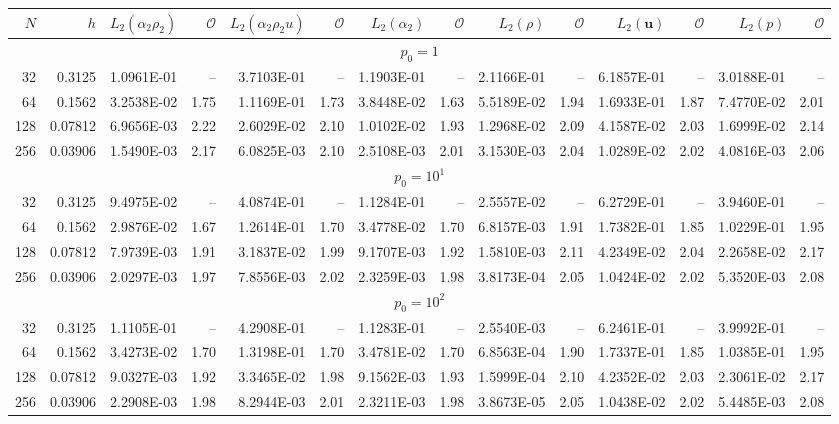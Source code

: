\begin{tabular}{rrrrrrrrrrrrrr}
\hline
$N$ & $h$ & $L_2(\alpha_2\rho_2)$ & $\mathcal{O}$ & $L_2(\alpha_2\rho_2u)$ & $\mathcal{O}$ & $L_2(\alpha_2)$ & $\mathcal{O}$ & $L_2(\rho)$ & $\mathcal{O}$ & $L_2(\mathbf{u})$ & $\mathcal{O}$ & $L_2(p)$ & $\mathcal{O}$ \\
\hline
\multicolumn{14}{c}{$p_0=1$} \\
32 & 0.3125 & 1.0961E-01 & -- & 3.7103E-01 & -- & 1.1903E-01 & -- & 2.1166E-01 & -- & 6.1857E-01 & -- & 3.0188E-01 & -- \\
64 & 0.1562 & 3.2538E-02 & 1.75 & 1.1169E-01 & 1.73 & 3.8448E-02 & 1.63 & 5.5189E-02 & 1.94 & 1.6933E-01 & 1.87 & 7.4770E-02 & 2.01 \\
128 & 0.07812 & 6.9656E-03 & 2.22 & 2.6029E-02 & 2.10 & 1.0102E-02 & 1.93 & 1.2968E-02 & 2.09 & 4.1587E-02 & 2.03 & 1.6999E-02 & 2.14 \\
256 & 0.03906 & 1.5490E-03 & 2.17 & 6.0825E-03 & 2.10 & 2.5108E-03 & 2.01 & 3.1530E-03 & 2.04 & 1.0289E-02 & 2.02 & 4.0816E-03 & 2.06 \\
\multicolumn{14}{c}{$p_0=10^{1}$} \\
32 & 0.3125 & 9.4975E-02 & -- & 4.0874E-01 & -- & 1.1284E-01 & -- & 2.5557E-02 & -- & 6.2729E-01 & -- & 3.9460E-01 & -- \\
64 & 0.1562 & 2.9876E-02 & 1.67 & 1.2614E-01 & 1.70 & 3.4778E-02 & 1.70 & 6.8157E-03 & 1.91 & 1.7382E-01 & 1.85 & 1.0229E-01 & 1.95 \\
128 & 0.07812 & 7.9739E-03 & 1.91 & 3.1837E-02 & 1.99 & 9.1707E-03 & 1.92 & 1.5810E-03 & 2.11 & 4.2349E-02 & 2.04 & 2.2658E-02 & 2.17 \\
256 & 0.03906 & 2.0297E-03 & 1.97 & 7.8556E-03 & 2.02 & 2.3259E-03 & 1.98 & 3.8173E-04 & 2.05 & 1.0424E-02 & 2.02 & 5.3520E-03 & 2.08 \\
\multicolumn{14}{c}{$p_0=10^{2}$} \\
32 & 0.3125 & 1.1105E-01 & -- & 4.2908E-01 & -- & 1.1283E-01 & -- & 2.5540E-03 & -- & 6.2461E-01 & -- & 3.9992E-01 & -- \\
64 & 0.1562 & 3.4273E-02 & 1.70 & 1.3198E-01 & 1.70 & 3.4781E-02 & 1.70 & 6.8563E-04 & 1.90 & 1.7337E-01 & 1.85 & 1.0385E-01 & 1.95 \\
128 & 0.07812 & 9.0327E-03 & 1.92 & 3.3465E-02 & 1.98 & 9.1562E-03 & 1.93 & 1.5999E-04 & 2.10 & 4.2352E-02 & 2.03 & 2.3061E-02 & 2.17 \\
256 & 0.03906 & 2.2908E-03 & 1.98 & 8.2944E-03 & 2.01 & 2.3211E-03 & 1.98 & 3.8673E-05 & 2.05 & 1.0438E-02 & 2.02 & 5.4485E-03 & 2.08 \\

\end{tabular}
